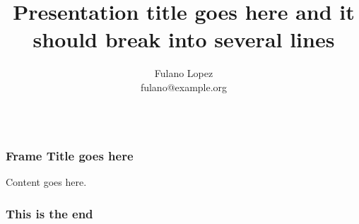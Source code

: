 \documentclass{beamer}
\begin{document}
\title{Presentation title goes here and it should break into several lines}
\author{Fulano Lopez\\
fulano@example.org \\~ 
}


\begin{frame}
    \maketitle
\end{frame}


\begin{frame}[fragile]
    \frametitle{Frame Title goes here}
    Content goes here.
\end{frame}

\begin{frame}[fragile]
\frametitle{This is the end}
\end{frame}
\end{document}
